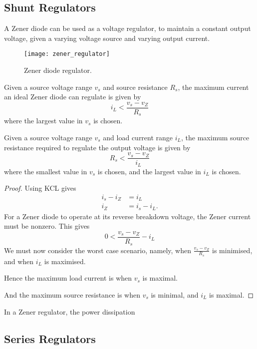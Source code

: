 \documentclass{article}
\begin{document}
\subsection{Shunt Regulators}
A Zener diode can be used as a voltage regulator, to maintain a constant output voltage,
given a varying voltage source and varying output current.
\begin{figure}[H]
    \centering
    \texttt{[image: zener\_regulator]}
    \caption{Zener diode regulator.}
\end{figure}
\begin{theorem}
    Given a source voltage range $v_s$ and source resistance $R_s$, the maximum current an ideal
    Zener diode can regulate is given by
    \begin{equation*}
        i_L < \frac{v_s - v_Z}{R_s}
    \end{equation*}
    where the largest value in $v_s$ is chosen.
\end{theorem}
\begin{theorem}
    Given a source voltage range $v_s$ and load current range $i_L$, the maximum source resistance required
    to regulate the output voltage is given by
    \begin{equation*}
        R_s < \frac{v_s - v_Z}{i_L}
    \end{equation*}
    where the smallest value in $v_s$ is chosen, and the largest value in $i_L$ is chosen.
\end{theorem}
\begin{proof}
    Using KCL gives
    \begin{align*}
        i_s - i_Z & = i_L       \\
        i_Z       & = i_s - i_L.
    \end{align*}
    For a Zener diode to operate at its reverse breakdown voltage, the Zener current 
    must be nonzero. This gives
    \begin{equation*}
        0 < \frac{v_s - v_Z}{R_s} - i_L
    \end{equation*}
    We must now consider the worst case scenario, namely, when
    $\frac{v_s - v_Z}{R_s}$ is minimised, and when $i_L$ is maximised. 
    
    Hence the maximum load current is when $v_s$ is maximal. 

    And the maximum source resistance is when $v_s$ is minimal, and $i_L$ is maximal.
\end{proof}
In a Zener regulator, the power dissipation 
\subsection{Series Regulators}
\newpage
\end{document}
